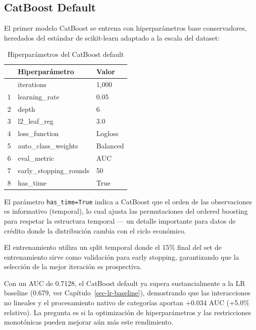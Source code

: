 \documentclass[
  spanish,
  11pt,
  letterpaper,
]{scrbook}
\theoremstyle{plain}
\theoremstyle{remark}
\begin{document}
\subsection{CatBoost Default}\label{sec-catboost-default}

El primer modelo CatBoost se entrena con hiperparámetros base
conservadores, heredados del estándar de scikit-learn adaptado a la
escala del dataset:

{

\begin{longtable}[]{@{}lll@{}}

\caption{\label{tbl-catboost-default-params}Hiperparámetros del CatBoost
default}

\tabularnewline

\toprule\noalign{}
& Hiperparámetro & Valor \\
\midrule\noalign{}
\endhead
\bottomrule\noalign{}
\endlastfoot
0 & iterations & 1,000 \\
1 & learning\_rate & 0.05 \\
2 & depth & 6 \\
3 & l2\_leaf\_reg & 3.0 \\
4 & loss\_function & Logloss \\
5 & auto\_class\_weights & Balanced \\
6 & eval\_metric & AUC \\
7 & early\_stopping\_rounds & 50 \\
8 & has\_time & True \\

\end{longtable}

}

El parámetro \texttt{has\_time=True} indica a CatBoost que el orden de
las observaciones es informativo (temporal), lo cual ajusta las
permutaciones del ordered boosting para respetar la estructura temporal
--- un detalle importante para datos de crédito donde la distribución
cambia con el ciclo económico.

El entrenamiento utiliza un split temporal donde el 15\% final del set
de entrenamiento sirve como validación para early stopping, garantizando
que la selección de la mejor iteración es prospectiva.

Con un AUC de 0.7128, el CatBoost default ya supera sustancialmente a la
LR baseline (0.679, ver Capítulo~\ref{sec-lr-baseline}), demostrando que
las interacciones no lineales y el procesamiento nativo de categorías
aportan +0.034 AUC (+5.0\% relativo). La pregunta es si la optimización
de hiperparámetros y las restricciones monotónicas pueden mejorar aún
más este rendimiento.
\end{document}
